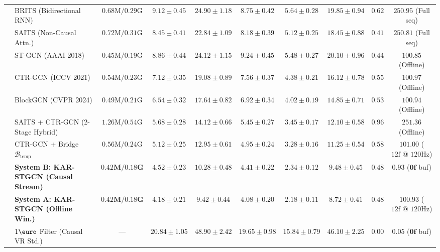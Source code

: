 \documentclass[10pt,twocolumn]{article}
\begin{document}
\begin{table}[!t]
{\begin{tabular}{llcccccccc}
& BRITS \cite{cao2018brits} (Bidirectional RNN) & $0.68\text{M} / 0.29\text{G}$ & $9.12 \pm 0.45$ & $24.90 \pm 1.18$ & $8.75 \pm 0.42$ & $5.64 \pm 0.28$ & $19.85 \pm 0.94$ & $0.62$ & $250.95$ (Full seq) \\
& SAITS \cite{du2023saits} (Non-Causal Attn.) & $0.72\text{M} / 0.31\text{G}$ & $8.45 \pm 0.41$ & $22.84 \pm 1.09$ & $8.18 \pm 0.39$ & $5.12 \pm 0.25$ & $18.45 \pm 0.88$ & $0.41$ & $250.81$ (Full seq) \\
& ST-GCN \cite{yan2018spatial} (AAAI 2018) & $0.45\text{M} / 0.19\text{G}$ & $8.86 \pm 0.44$ & $24.12 \pm 1.15$ & $9.24 \pm 0.45$ & $5.48 \pm 0.27$ & $20.10 \pm 0.96$ & $0.44$ & $100.85$ (Offline) \\
& CTR-GCN \cite{chen2021channel} (ICCV 2021) & $0.54\text{M} / 0.23\text{G}$ & $7.12 \pm 0.35$ & $19.08 \pm 0.89$ & $7.56 \pm 0.37$ & $4.38 \pm 0.21$ & $16.12 \pm 0.78$ & $0.55$ & $100.97$ (Offline) \\
& BlockGCN \cite{zhou2024blockgcn} (CVPR 2024) & $0.49\text{M} / 0.21\text{G}$ & $6.54 \pm 0.32$ & $17.64 \pm 0.82$ & $6.92 \pm 0.34$ & $4.02 \pm 0.19$ & $14.85 \pm 0.71$ & $0.53$ & $100.94$ (Offline) \\
& SAITS + CTR-GCN (2-Stage Hybrid) & $1.26\text{M} / 0.54\text{G}$ & $5.68 \pm 0.28$ & $14.12 \pm 0.66$ & $5.45 \pm 0.27$ & $3.45 \pm 0.17$ & $12.10 \pm 0.58$ & $0.96$ & $251.36$ (Offline) \\
& CTR-GCN + Bridge $\mathcal{B}_{\text{temp}}$ & $0.56\text{M} / 0.24\text{G}$ & $5.12 \pm 0.25$ & $12.95 \pm 0.61$ & $4.95 \pm 0.24$ & $3.28 \pm 0.16$ & $11.25 \pm 0.54$ & $0.58$ & $101.00$ ($12\text{f @ 120Hz}$) \\
& \textbf{System B: KAR-STGCN (Causal Stream)} & $\mathbf{0.42\text{M} / 0.18\text{G}}$ & $4.52 \pm 0.23$ & $10.28 \pm 0.48$ & $4.41 \pm 0.22$ & $2.34 \pm 0.12$ & $9.48 \pm 0.45$ & $0.48$ & $\mathbf{0.93}$ ($\mathbf{0\text{f}}$ buf) \\
& \textbf{System A: KAR-STGCN (Offline Win.)} & $\mathbf{0.42\text{M} / 0.18\text{G}}$ & $\mathbf{4.18 \pm 0.21}$ & $\mathbf{9.42 \pm 0.44}$ & $\mathbf{4.08 \pm 0.20}$ & $\mathbf{2.18 \pm 0.11}$ & $\mathbf{8.72 \pm 0.41}$ & $0.48$ & $100.93$ ($12\text{f @ 120Hz}$) \\
\midrule
{}
& $1\text{\euro}$ Filter \cite{casiez20121euro} (Causal VR Std.) & --- & $20.84 \pm 1.05$ & $48.90 \pm 2.42$ & $19.65 \pm 0.98$ & $15.84 \pm 0.79$ & $46.10 \pm 2.25$ & $0.00$ & $\mathbf{0.05}$ ($\mathbf{0\text{f}}$ buf) \\

\end{tabular}}
\end{table}
\end{document}
